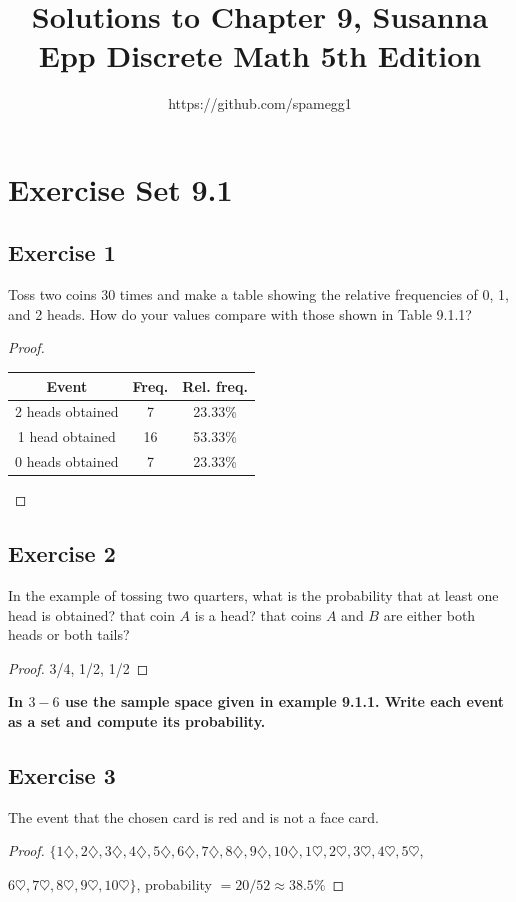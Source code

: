 \documentclass[14pt]{extarticle}
\title{Solutions to Chapter 9, Susanna Epp Discrete Math 5th Edition}
\author{https://github.com/spamegg1}
\newcommand{\cy}{\color{cyan}}
\begin{document}
\maketitle
\tableofcontents

\section{Exercise Set 9.1}

\subsection{Exercise 1}
Toss two coins 30 times and make a table showing the relative frequencies of 0, 1, and 2 heads. How do your 
values compare with those shown in Table 9.1.1?

\begin{proof}
\begin{tabular}{|c|c|c|}
\hline
{\bf\cy Event} & {\bf\cy Freq.} & {\bf\cy Rel. freq.} \\
\hline
2 heads obtained & 7 & 23.33\% \\
\hline
1 head obtained & 16 & 53.33\% \\
\hline
0 heads obtained & 7 & 23.33\% \\
\hline
\end{tabular}
\end{proof}

\subsection{Exercise 2}
In the example of tossing two quarters, what is the probability that at least one head is obtained? that coin 
$A$ is a head? that coins $A$ and $B$ are either both
heads or both tails?

\begin{proof}
3/4, 1/2, 1/2
\end{proof}

{\bf \cy In $3-6$ use the sample space given in example 9.1.1. Write each event as a set and compute its 
probability.}

\subsection{Exercise 3}
The event that the chosen card is red and is not a face card.

\begin{proof}
\(\{1\diamondsuit, 2\diamondsuit, 3\diamondsuit, 4\diamondsuit, 5\diamondsuit, 6\diamondsuit, 7\diamondsuit, 
8\diamondsuit, 9\diamondsuit, 10\diamondsuit, 1\heartsuit, 2\heartsuit, 3\heartsuit, 4\heartsuit, 5\heartsuit\), 

\(6\heartsuit, 7\heartsuit, 8\heartsuit, 9\heartsuit, 10\heartsuit\}\), probability \(= 20/52 \approx 38.5\%\)
\end{proof}
\end{document}
